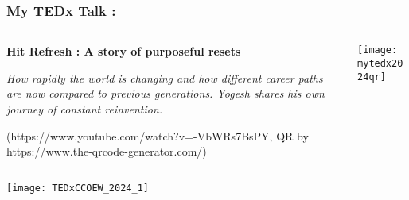 \begin{frame}[fragile]\frametitle{My TEDx Talk : }
\begin{columns}
    \begin{column}[T]{0.6\linewidth}
	\textbf{Hit Refresh : A story of purposeful resets}
	
{\it 
How rapidly the world is changing and how different career paths are now compared to previous generations. Yogesh shares his own journey of constant reinvention.}
			
		{\tiny (https://www.youtube.com/watch?v=-VbWRs7BsPY, QR by https://www.the-qrcode-generator.com/)}
			
    \end{column}
    \begin{column}[T]{0.4\linewidth}
		\begin{center}
		\texttt{[image: mytedx2024qr]}
		\end{center}	
    \end{column}
  \end{columns}
  
  		\begin{center}
		\texttt{[image: TEDxCCOEW\_2024\_1]}
		\end{center}
\end{frame}